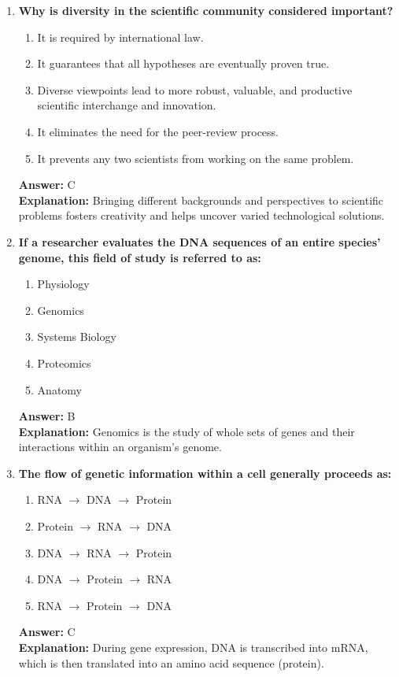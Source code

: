 \documentclass[11pt, a4paper]{article}
\begin{document}
\begin{enumerate}
\item \textbf{Why is diversity in the scientific community considered important?}
\begin{enumerate}[label=\Alph*.]
    \item It is required by international law.
    \item It guarantees that all hypotheses are eventually proven true.
    \item Diverse viewpoints lead to more robust, valuable, and productive scientific interchange and innovation.
    \item It eliminates the need for the peer-review process.
    \item It prevents any two scientists from working on the same problem.
\end{enumerate}
\textbf{Answer:} C \\
\textbf{Explanation:} Bringing different backgrounds and perspectives to scientific problems fosters creativity and helps uncover varied technological solutions.

\item \textbf{If a researcher evaluates the DNA sequences of an entire species' genome, this field of study is referred to as:}
\begin{enumerate}[label=\Alph*.]
    \item Physiology
    \item Genomics
    \item Systems Biology
    \item Proteomics
    \item Anatomy
\end{enumerate}
\textbf{Answer:} B \\
\textbf{Explanation:} Genomics is the study of whole sets of genes and their interactions within an organism's genome.

\item \textbf{The flow of genetic information within a cell generally proceeds as:}
\begin{enumerate}[label=\Alph*.]
    \item RNA $\rightarrow$ DNA $\rightarrow$ Protein
    \item Protein $\rightarrow$ RNA $\rightarrow$ DNA
    \item DNA $\rightarrow$ RNA $\rightarrow$ Protein
    \item DNA $\rightarrow$ Protein $\rightarrow$ RNA
    \item RNA $\rightarrow$ Protein $\rightarrow$ DNA
\end{enumerate}
\textbf{Answer:} C \\
\textbf{Explanation:} During gene expression, DNA is transcribed into mRNA, which is then translated into an amino acid sequence (protein).


\end{enumerate}
\end{document}

